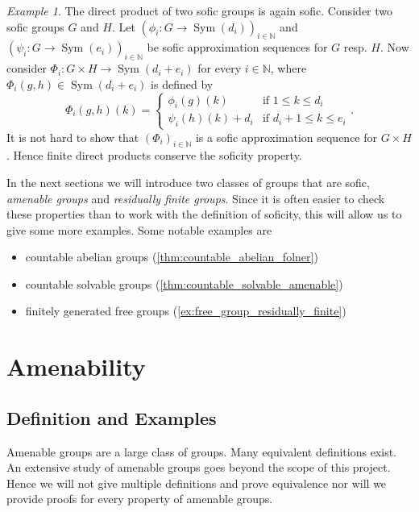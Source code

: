 \documentclass[titlepage, a4paper]{article}
\newcommand{\N}{\mathbb{N}}
\DeclareMathOperator{\sym}{Sym}
\theoremstyle{remark}
\newtheorem{example}[theorem]{Example}
\begin{document}
    \begin{example}\label{ex:direct_product_sofic}
        The direct product of two sofic groups is again sofic. Consider two sofic groups $G$ and $H$. Let $(\phi_i: G \to \sym(d_i))_{i \in \N}$ and $(\psi_i: G \to \sym(e_i))_{i \in \N}$ be sofic approximation sequences for $G$ resp. $H$. Now consider $\Phi_i : G \times H \to \sym(d_i+e_i)$ for every $i \in \N$, where $\Phi_i(g, h) \in \sym(d_i+e_i)$ is defined by
        \[
            \Phi_i(g,h)(k) = \begin{cases} \phi_i(g)(k) & \text{if } 1 \leq k \leq d_i \\
            \psi_i(h)(k)+d_i & \text{if } d_i + 1 \leq k \leq e_i
            \end{cases}.
        \]
        It is not hard to show that $(\Phi_i)_{i \in \N}$ is a sofic approximation sequence for $G \times H$. %
	Hence finite direct products conserve the soficity property. 
    \end{example}

    In the next sections we will introduce two classes of groups that are sofic, \emph{amenable groups} and \emph{residually finite groups}. Since it is often easier to check these properties than to work with the definition of soficity, this will allow us to give some more examples. 
    Some notable examples are 
    \begin{itemize}
	    \item countable abelian groups (\cref{thm:countable_abelian_folner})
	    \item countable solvable groups (\cref{thm:countable_solvable_amenable})
	    \item finitely generated free groups (\cref{ex:free_group_residually_finite})
    \end{itemize}
    

    \section{Amenability} \label{sec:amenable}

	\subsection{Definition and Examples}

    Amenable groups are a large class of groups. 
    Many equivalent definitions exist. 
    An extensive study of amenable groups goes beyond the scope of this project. Hence we will not give multiple definitions and prove equivalence nor will we provide proofs for every property of amenable groups.
\end{document}
